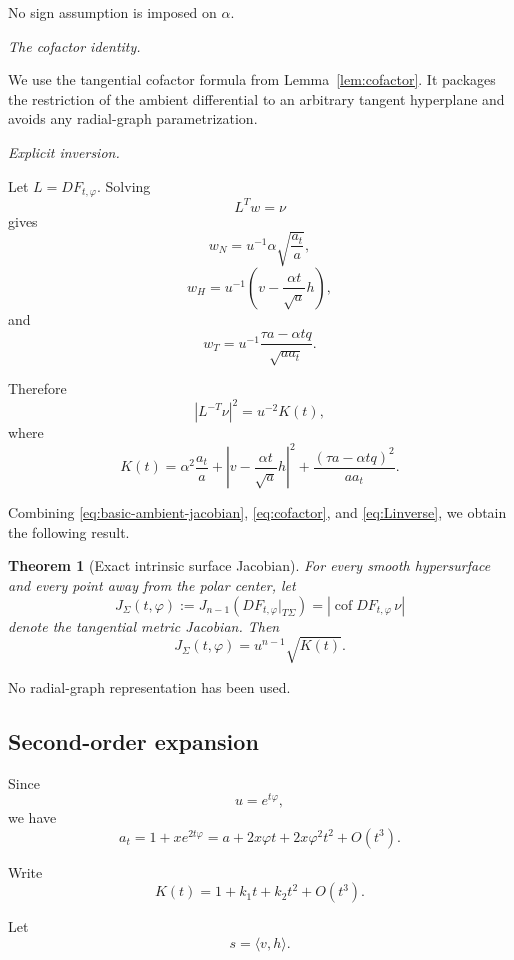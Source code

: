 \documentclass[11pt,reqno]{amsart}
\numberwithin{equation}{section}
\newtheorem{theorem}{Theorem}[section]
\theoremstyle{definition}
\theoremstyle{remark}
\newcommand{\cof}{\operatorname{cof}}
\newcommand{\ithead}[1]{%
  \par\medskip\noindent\textit{#1}\enspace
}
\begin{document}
No sign assumption is imposed on \(\alpha\).

\ithead{The cofactor identity.}
We use the tangential cofactor formula from
Lemma~\ref{lem:cofactor}.  It packages the restriction of the ambient
differential to an arbitrary tangent hyperplane and avoids any radial-graph
parametrization.

\ithead{Explicit inversion.}

Let \(L=DF_{t,\varphi}\). Solving
\[
L^Tw=\nu
\]
gives
\[
w_N
=
u^{-1}\alpha\sqrt{\frac{a_t}{a}},
\]
\[
w_H
=
u^{-1}
\left(
v-\frac{\alpha t}{\sqrt a}h
\right),
\]
and
\[
w_T
=
u^{-1}
\frac{\tau a-\alpha tq}{\sqrt{aa_t}}.
\]

Therefore
\begin{equation}
|L^{-T}\nu|^2
=
u^{-2}K(t),
\label{eq:Linverse}
\end{equation}
where
\begin{equation}
K(t)
=
\alpha^2\frac{a_t}{a}
+
\left|
v-\frac{\alpha t}{\sqrt a}h
\right|^2
+
\frac{(\tau a-\alpha tq)^2}{aa_t}.
\label{eq:K}
\end{equation}

Combining
\eqref{eq:basic-ambient-jacobian},
\eqref{eq:cofactor}, and
\eqref{eq:Linverse}, we obtain the following result.

\begin{theorem}[Exact intrinsic surface Jacobian]
\label{thm:surface-jacobian}
For every smooth hypersurface and every point away from the polar center,
let
\[
J_\Sigma(t,\varphi)
:=
J_{n-1}\!\left(
DF_{t,\varphi}|_{T\Sigma}
\right)
=
\left|\cof DF_{t,\varphi}\,\nu\right|
\]
denote the tangential metric Jacobian. Then
\[
J_\Sigma(t,\varphi)
=
u^{n-1}\sqrt{K(t)}.
\]
\end{theorem}

No radial-graph representation has been used.

\subsection{Second-order expansion}

Since
\[
u=e^{t\varphi},
\]
we have
\[
a_t
=
1+xe^{2t\varphi}
=
a+2x\varphi t+2x\varphi^2t^2+O(t^3).
\]

Write
\[
K(t)
=
1+k_1t+k_2t^2+O(t^3).
\]

Let
\[
s=\langle v,h\rangle.
\]
\end{document}
